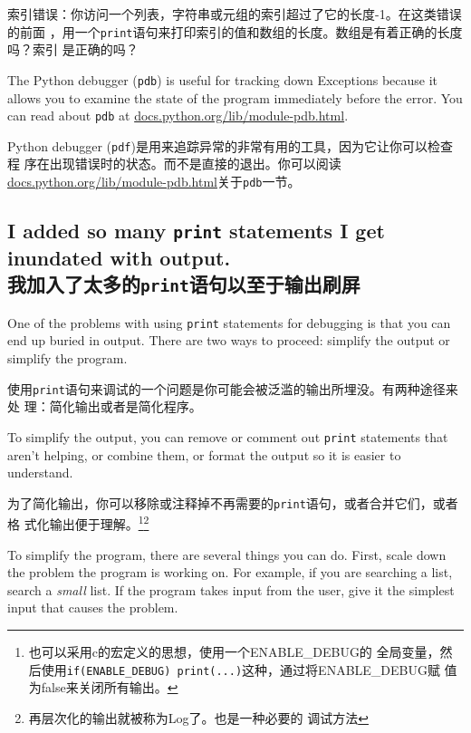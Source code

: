 \documentclass[10pt]{book}
\begin{document}
\begin{CJK}{UTF8}{gbsn}
\begin{description}
索引错误：你访问一个列表，字符串或元组的索引超过了它的长度-1。在这类错误的前面
，用一个{\tt print}语句来打印索引的值和数组的长度。数组是有着正确的长度吗？索引
是正确的吗？

\end{description}

The Python debugger ({\tt pdb}) is useful for tracking down
Exceptions because it allows you to examine the state of the
program immediately before the error.  You can read
about {\tt pdb} at \url{docs.python.org/lib/module-pdb.html}.

Python debugger ({\tt pdf})是用来追踪异常的非常有用的工具，因为它让你可以检查程
序在出现错误时的状态。而不是直接的退出。你可以阅读
\url{docs.python.org/lib/module-pdb.html}关于{\tt pdb}一节。

\subsection{I added so many {\tt print} statements I get inundated with
output.\\我加入了太多的{\tt print}语句以至于输出刷屏}

One of the problems with using {\tt print} statements for debugging
is that you can end up buried in output.  There are two ways
to proceed: simplify the output or simplify the program.

使用{\tt print}语句来调试的一个问题是你可能会被泛滥的输出所埋没。有两种途径来处
理：简化输出或者是简化程序。

To simplify the output, you can remove or comment out {\tt print}
statements that aren't helping, or combine them, or format
the output so it is easier to understand.

为了简化输出，你可以移除或注释掉不再需要的{\tt print}语句，或者合并它们，或者格
式化输出便于理解。\footnote{也可以采用c的宏定义的思想，使用一个ENABLE\_DEBUG的
全局变量，然后使用{\tt if(ENABLE\_DEBUG) print(...)}这种，通过将ENABLE\_DEBUG赋
值为false来关闭所有输出。}\footnote{再层次化的输出就被称为Log了。也是一种必要的
调试方法}

To simplify the program, there are several things you can do.  First,
scale down the problem the program is working on.  For example, if you
are searching a list, search a {\em small} list.  If the program takes
input from the user, give it the simplest input that causes the
problem.


\end{CJK}
\end{document}

